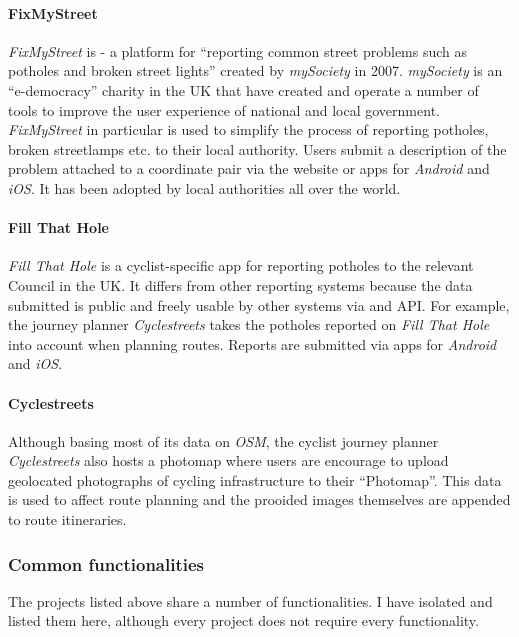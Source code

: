 \documentclass{article}
\begin{document}
		\paragraph{FixMyStreet}
		\textit{FixMyStreet} is - a platform for ``reporting common street problems such as potholes and broken street lights''\cite{_mysociety/fixmystreet_2015} created by \textit{mySociety} in 2007. \textit{mySociety} is an ``e-democracy'' charity in the UK that have created and operate a number of tools to improve the user experience of national and local government. \textit{FixMyStreet} in particular is used to simplify the process of reporting potholes, broken streetlamps etc. to their local authority. Users submit a description of the problem attached to a coordinate pair via the website or apps for \textit{Android} and \textit{iOS}. It has been adopted by local authorities all over the world.

		\paragraph{Fill That Hole}
		\textit{Fill That Hole} is a cyclist-specific app for reporting potholes to the relevant Council in the UK. It differs from other reporting systems because the data submitted is public and freely usable by other systems via and API. For example, the journey planner \textit{Cyclestreets} takes the potholes reported on \textit{Fill That Hole} into account when planning routes. Reports are submitted via apps for \textit{Android} and \textit{iOS}.

		\paragraph{Cyclestreets}
		Although basing most of its data on \textit{OSM}, the cyclist journey planner \textit{Cyclestreets} also hosts a photomap where users are encourage to upload geolocated photographs of cycling infrastructure to their ``Photomap''. This data is used to affect route planning and the prooided images themselves are appended to route itineraries\cite{_cyclestreets_????}.

		\subsubsection{Common functionalities}

		The projects listed above share a number of functionalities. I have isolated and listed them here, although every project does not require every functionality.
\end{document}
